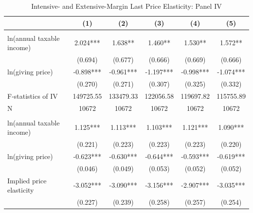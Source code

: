 \documentclass[ review  , 3p ]{elsarticle}
\begin{document}
  \begin{table}

  \caption{\label{tab:kableLastElasticity2}Intensive- and Extensive-Margin Last Price Elasticity: Panel IV}
  \centering
  \fontsize{7}{9}\selectfont
  \begin{threeparttable}
  \begin{tabular}[t]{lccccc}
  \toprule
   & (1) & (2) & (3) & (4) & (5)\\
  \midrule
  \addlinespace[0.3em]
  \multicolumn{6}{l}{\textbf{Intensive-Margin Elasticity}}\\
  \hspace{1em}ln(annual taxable income) & 2.024*** & 1.638** & 1.460** & 1.530** & 1.572**\\
  \hspace{1em} & (0.694) & (0.677) & (0.666) & (0.669) & (0.666)\\
  \hspace{1em}ln(giving price) & -0.898*** & -0.961*** & -1.197*** & -0.998*** & -1.074***\\
  \hspace{1em} & (0.270) & (0.271) & (0.307) & (0.325) & (0.332)\\
  \hspace{1em}F-statistics of IV & 149725.55 & 133479.33 & 122056.58 & 119697.82 & \vphantom{1} 115755.89\\
  \hspace{1em}N & 10672 & 10672 & 10672 & 10672 & 10672\\
  \addlinespace[0.3em]
  \multicolumn{6}{l}{\textbf{Extensive-Margin Elasticity}}\\
  \hspace{1em}ln(annual taxable income) & 1.125*** & 1.113*** & 1.103*** & 1.121*** & 1.090***\\
  \hspace{1em} & (0.221) & (0.223) & (0.223) & (0.223) & (0.220)\\
  \hspace{1em}ln(giving price) & -0.623*** & -0.630*** & -0.644*** & -0.593*** & -0.619***\\
  \hspace{1em} & (0.046) & (0.049) & (0.053) & (0.052) & (0.052)\\
  \hspace{1em}Implied price elasticity & -3.052*** & -3.090*** & -3.156*** & -2.907*** & -3.035***\\
  \hspace{1em} & (0.227) & (0.239) & (0.258) & (0.257) & (0.254)\\

\end{tabular}
\end{threeparttable}
\end{table}
\end{document}
